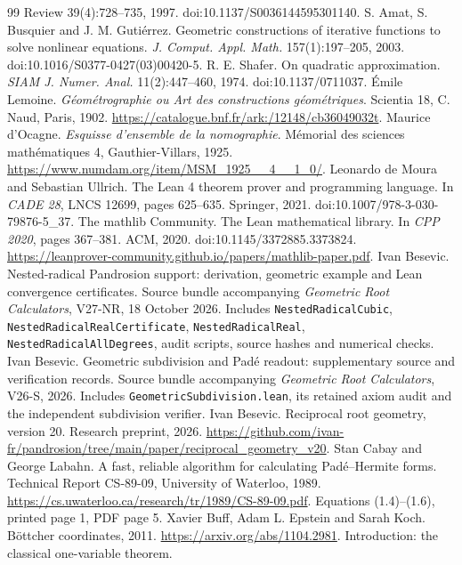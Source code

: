 \begin{thebibliography}{99}
{Review} 39(4):728--735, 1997. doi:10.1137/S0036144595301140.
 S. Amat, S. Busquier and J. M. Guti\'errez. Geometric constructions of iterative
functions to solve nonlinear equations. \emph{J. Comput. Appl. Math.} 157(1):197--205, 2003.
doi:10.1016/S0377-0427(03)00420-5.
 R. E. Shafer. On quadratic approximation. \emph{SIAM J. Numer. Anal.}
11(2):447--460, 1974. doi:10.1137/0711037.
 \'Emile Lemoine. \emph{G\'eom\'etrographie ou Art des constructions
g\'eom\'etriques}. Scientia 18, C. Naud, Paris, 1902.
\url{https://catalogue.bnf.fr/ark:/12148/cb36049032t}.
 Maurice d'Ocagne. \emph{Esquisse d'ensemble de la nomographie}. M\'emorial des
sciences math\'ematiques 4, Gauthier-Villars, 1925.
\url{https://www.numdam.org/item/MSM_1925__4__1_0/}.
 Leonardo de Moura and Sebastian Ullrich. The Lean 4 theorem prover and programming
language. In \emph{CADE 28}, LNCS 12699, pages 625--635. Springer, 2021.
doi:10.1007/978-3-030-79876-5\_37.
 The mathlib Community. The Lean mathematical library. In \emph{CPP 2020}, pages
367--381. ACM, 2020. doi:10.1145/3372885.3373824.
\url{https://leanprover-community.github.io/papers/mathlib-paper.pdf}.
 Ivan Besevic. Nested-radical Pandrosion support: derivation, geometric example and
Lean convergence certificates. Source bundle accompanying \emph{Geometric Root Calculators}, V27-NR,
18 October 2026. Includes \texttt{NestedRadicalCubic}, \texttt{NestedRadicalRealCertificate},
\texttt{NestedRadicalReal}, \texttt{NestedRadicalAllDegrees}, audit scripts, source hashes and
numerical checks.
 Ivan Besevic. Geometric subdivision and Pad\'e readout: supplementary source and
verification records. Source bundle accompanying \emph{Geometric Root Calculators}, V26-S, 2026.
Includes \texttt{GeometricSubdivision.lean}, its retained axiom audit and the independent subdivision
verifier.
 Ivan Besevic. Reciprocal root geometry, version 20. Research preprint, 2026.
\url{https://github.com/ivan-fr/pandrosion/tree/main/paper/reciprocal_geometry_v20}.
 Stan Cabay and George Labahn. A fast, reliable algorithm for calculating
Pad\'e--Hermite forms. Technical Report CS-89-09, University of Waterloo, 1989.
\url{https://cs.uwaterloo.ca/research/tr/1989/CS-89-09.pdf}. Equations (1.4)--(1.6), printed page 1,
PDF page 5.
 Xavier Buff, Adam L. Epstein and Sarah Koch. B\"ottcher coordinates, 2011.
\url{https://arxiv.org/abs/1104.2981}. Introduction: the classical one-variable theorem.
\end{thebibliography}

